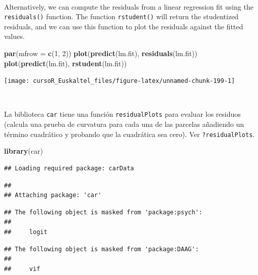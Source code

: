 \documentclass[]{book}
\newenvironment{Shaded}{\begin{snugshade}}{\end{snugshade}}
\newcommand{\KeywordTok}[1]{\textcolor[rgb]{0.13,0.29,0.53}{\textbf{#1}}}
\newcommand{\DataTypeTok}[1]{\textcolor[rgb]{0.13,0.29,0.53}{#1}}
\newcommand{\DecValTok}[1]{\textcolor[rgb]{0.00,0.00,0.81}{#1}}
\newcommand{\NormalTok}[1]{#1}
\begin{document}
~

Alternatively, we can compute the residuals from a linear regression fit
using the \texttt{residuals()} function. The function
\texttt{rstudent()} will return the studentized residuals, and we can
use this function to plot the residuals against the fitted values.

\begin{Shaded}
\begin{Highlighting}[]
\KeywordTok{par}\NormalTok{(}\DataTypeTok{mfrow =} \KeywordTok{c}\NormalTok{(}\DecValTok{1}\NormalTok{, }\DecValTok{2}\NormalTok{))}
\KeywordTok{plot}\NormalTok{(}\KeywordTok{predict}\NormalTok{(lm.fit), }\KeywordTok{residuals}\NormalTok{(lm.fit))}
\KeywordTok{plot}\NormalTok{(}\KeywordTok{predict}\NormalTok{(lm.fit), }\KeywordTok{rstudent}\NormalTok{(lm.fit))}
\end{Highlighting}
\end{Shaded}

\begin{center}\texttt{[image: cursoR\_Euskaltel\_files/figure-latex/unnamed-chunk-199-1]} \end{center}

~

La biblioteca \texttt{car} tiene una función \texttt{residualPlots} para
evaluar los residuos (calcula una prueba de curvatura para cada una de
las parcelas añadiendo un término cuadrático y probando que la
cuadrática sea cero). Ver \texttt{?residualPlots}.

\begin{Shaded}
\begin{Highlighting}[]
\KeywordTok{library}\NormalTok{(car)}
\end{Highlighting}
\end{Shaded}

\begin{verbatim}
## Loading required package: carData
\end{verbatim}

\begin{verbatim}
## 
## Attaching package: 'car'
\end{verbatim}

\begin{verbatim}
## The following object is masked from 'package:psych':
## 
##     logit
\end{verbatim}

\begin{verbatim}
## The following object is masked from 'package:DAAG':
## 
##     vif
\end{verbatim}
\end{document}
